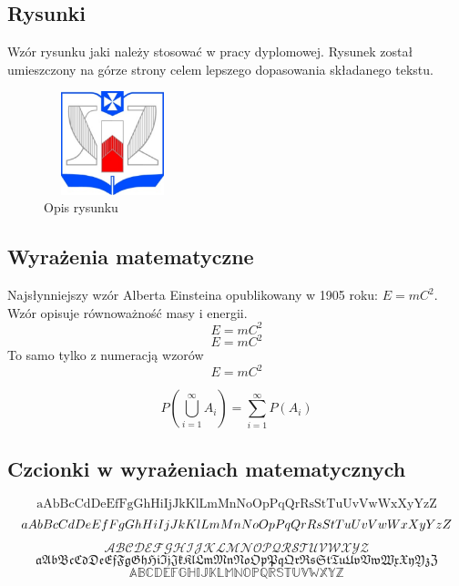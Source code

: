 \subsection{Rysunki}
Wzór rysunku jaki należy stosować w pracy dyplomowej.
Rysunek został umieszczony na górze strony celem lepszego dopasowania składanego tekstu.
\begin{figure}[!ht]
	\begin{center}
	\includegraphics[width=4cm, height=3cm, angle=45]{logoWSIiZ}
        \caption{{\footnotesize Opis rysunku}}
	\end{center}
\end{figure}

\subsection{Wyrażenia matematyczne}
Najsłynniejszy wzór Alberta Einsteina opublikowany w 1905 roku: \(E=mC^{2}\). 
Wzór opisuje równoważność masy i energii.
\[ E=mC^{2} \]
\begin{displaymath}E=mC^{2}\end{displaymath}
To samo tylko z numeracją wzorów
\begin{equation}E=mC^{2}\end{equation}

\begin{equation}P\left(\bigcup_{i=1}^{\infty}{A_i} \right)=\sum_{i=1}^{\infty}{P(A_i)}\end{equation}

\subsection{Czcionki w wyrażeniach matematycznych}
\noindent
\[ \mathrm{aAbBcCdDeEfFgGhHiIjJkKlLmMnNoOpPqQrRsStTuUvVwWxXyYzZ} \]
\[ \mathnormal{aAbBcCdDeEfFgGhHiIjJkKlLmMnNoOpPqQrRsStTuUvVwWxXyYzZ} \]
\[ \mathcal{ABCDEFGHIJKLMNOPQRSTUVWXYZ} \]
\[ \mathfrak{aAbBcCdDeEfFgGhHiIjJkKlLmMnNoOpPqQrRsStTuUvVwWxXyYzZ} \]
\[ \mathbb{ABCDEFGHIJKLMNOPQRSTUVWXYZ} \]

